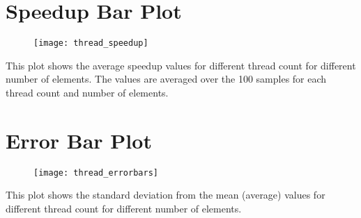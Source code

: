\documentclass{article}
\begin{document}
\newpage
\section*{Speedup Bar Plot}
\begin{figure}[!htb]
    \centering
    \texttt{[image: thread\_speedup]}
    \label{speedup}
\end{figure}
This plot shows the average speedup values for different thread count for different number of elements. \newline
The values are averaged over the 100 samples for each thread count and number of elements.

\newpage
\section*{Error Bar Plot}
\begin{figure}[!htb]
    \centering
    \texttt{[image: thread\_errorbars]}
    \label{errorbars}
\end{figure}
This plot shows the standard deviation from the mean (average) values for different thread count for different number of elements.
\end{document}
